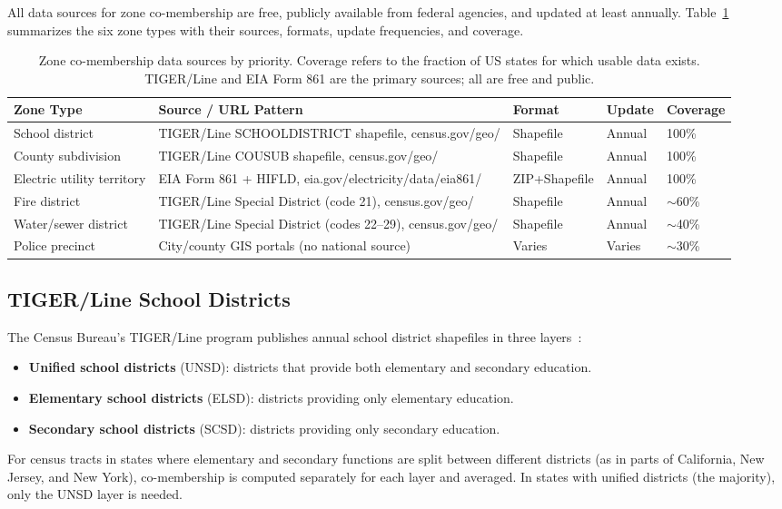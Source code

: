 \label{sec:data-sources}

All data sources for zone co-membership are free, publicly available from federal agencies,
and updated at least annually.
Table~\ref{tab:data-sources} summarizes the six zone types with their sources, formats,
update frequencies, and coverage.

\begin{table}[ht]
\centering
\caption{Zone co-membership data sources by priority. Coverage refers to the
  fraction of US states for which usable data exists. TIGER/Line and EIA
  Form 861 are the primary sources; all are free and public.}
\label{tab:data-sources}
\small
\begin{tabularx}{\textwidth}{@{}p{2.4cm}Xp{1.8cm}p{1.2cm}p{1.2cm}@{}}
\toprule
\textbf{Zone Type} & \textbf{Source / URL Pattern} & \textbf{Format} & \textbf{Update} & \textbf{Coverage} \\
\midrule
School district
  & TIGER/Line SCHOOLDISTRICT shapefile, census.gov/geo/
  & Shapefile
  & Annual
  & 100\% \\
County subdivision
  & TIGER/Line COUSUB shapefile, census.gov/geo/
  & Shapefile
  & Annual
  & 100\% \\
Electric utility territory
  & EIA Form 861 + HIFLD, eia.gov/electricity/data/eia861/
  & ZIP+Shapefile
  & Annual
  & 100\% \\
Fire district
  & TIGER/Line Special District (code 21), census.gov/geo/
  & Shapefile
  & Annual
  & $\sim$60\% \\
Water/sewer district
  & TIGER/Line Special District (codes 22--29), census.gov/geo/
  & Shapefile
  & Annual
  & $\sim$40\% \\
Police precinct
  & City/county GIS portals (no national source)
  & Varies
  & Varies
  & $\sim$30\% \\
\bottomrule
\end{tabularx}
\end{table}

\subsection{TIGER/Line School Districts}

The Census Bureau's TIGER/Line program publishes annual school district shapefiles
in three layers~\citep{census2020tiger}:
\begin{itemize}
  \item \textbf{Unified school districts} (UNSD): districts that provide both
    elementary and secondary education.
  \item \textbf{Elementary school districts} (ELSD): districts providing only
    elementary education.
  \item \textbf{Secondary school districts} (SCSD): districts providing only
    secondary education.
\end{itemize}
For census tracts in states where elementary and secondary functions are split
between different districts (as in parts of California, New Jersey, and New York),
co-membership is computed separately for each layer and averaged.
In states with unified districts (the majority), only the UNSD layer is needed.


